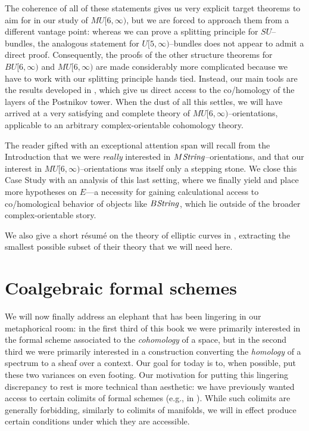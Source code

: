 The coherence of all of these statements gives us very explicit target theorems to aim for in our study of $MU[6, \infty)$, but we are forced to approach them from a different vantage point: whereas we can prove a splitting principle for $SU$--bundles, the analogous statement for $U[5, \infty)$--bundles does not appear to admit a direct proof.  Consequently, the proofs of the other structure theorems for $BU[6, \infty)$ and $MU[6, \infty)$ are made considerably more complicated because we have to work with our splitting principle hands tied.  Instead, our main tools are the results developed in , which give us direct access to the co/homology of the layers of the Postnikov tower.  When the dust of all this settles, we will have arrived at a very satisfying and complete theory of $MU[6, \infty)$--orientations, applicable to an arbitrary complex-orientable cohomology theory.

The reader gifted with an exceptional attention span will recall from the Introduction that we were \emph{really} interested in $M\mathit{String}$--orientations, and that our interest in $MU[6, \infty)$--orientations was itself only a stepping stone.  We close this Case Study with an analysis of this last setting, where we finally yield and place more hypotheses on $E$---a necessity for gaining calculational access to co/homological behavior of objects like $B\mathit{String}$, which lie outside of the broader complex-orientable story.

We also give a short r\'esum\'e on the theory of elliptic curves in , extracting the smallest possible subset of their theory that we will need here.









\section{Coalgebraic formal schemes}

We will now finally address an elephant that has been lingering in our metaphorical room: in the first third of this book we were primarily interested in the formal scheme associated to the \emph{cohomology} of a space, but in the second third we were primarily interested in a construction converting the \emph{homology} of a spectrum to a sheaf over a context.  Our goal for today is to, when possible, put these two variances on even footing.  Our motivation for putting this lingering discrepancy to rest is more technical than aesthetic: we have previously wanted access to certain colimits of formal schemes (e.g., in ).  While such colimits are generally forbidding, similarly to colimits of manifolds, we will in effect produce certain conditions under which they are accessible.

